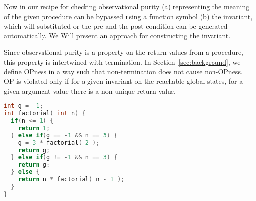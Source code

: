 \documentclass{llncs}
\begin{document}


Now in our recipe for checking observational purity (a) representing the
meaning of the given procedure can be bypassed using a function symbol
(b) the invariant, which will substituted or the pre and the post
condition can be generated automatically. We Will present an approach
for constructing the invariant.
  

Since observational purity is a property on the return values from a
procedure, this property is intertwined with termination. In
Section~\ref{sec:background}, we define OPness in a way such that
non-termination does not cause non-OPness. OP is violated only if for
a given invariant on the reachable global states, for a given argument
value there is a non-unique return value.



\begin{lstlisting}[language=c, caption= {Procedure `factorial' :
      returns factorial of `n' and memoizes result for argument value
      `3'.}, label=lst:factorialSimple]
int g = -1;
int factorial( int n) {
  if(n <= 1) {
    return 1;
  } else if(g == -1 && n == 3) {
    g = 3 * factorial( 2 );
    return g;
  } else if(g != -1 && n == 3) {
    return g;
  } else {
    return n * factorial( n - 1 );
  }
}
\end{lstlisting}
\end{document}
